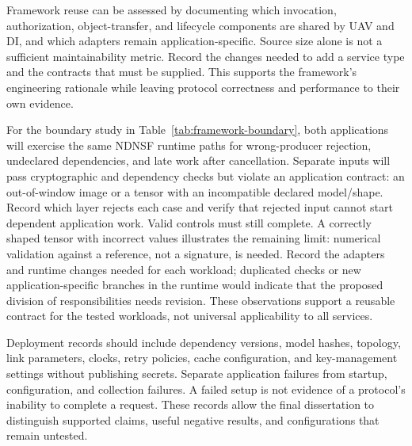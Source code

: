 Framework reuse can be assessed by documenting which invocation, authorization, object-transfer, and lifecycle components are shared by UAV and DI, and which adapters remain application-specific. Source size alone is not a sufficient maintainability metric. Record the changes needed to add a service type and the contracts that must be supplied. This supports the framework's engineering rationale while leaving protocol correctness and performance to their own evidence.

For the boundary study in Table~\ref{tab:framework-boundary}, both applications will exercise the same NDNSF runtime paths for wrong-producer rejection, undeclared dependencies, and late work after cancellation. Separate inputs will pass cryptographic and dependency checks but violate an application contract: an out-of-window image or a tensor with an incompatible declared model/shape. Record which layer rejects each case and verify that rejected input cannot start dependent application work. Valid controls must still complete. A correctly shaped tensor with incorrect values illustrates the remaining limit: numerical validation against a reference, not a signature, is needed. Record the adapters and runtime changes needed for each workload; duplicated checks or new application-specific branches in the runtime would indicate that the proposed division of responsibilities needs revision. These observations support a reusable contract for the tested workloads, not universal applicability to all services.

Deployment records should include dependency versions, model hashes, topology, link parameters, clocks, retry policies, cache configuration, and key-management settings without publishing secrets. Separate application failures from startup, configuration, and collection failures. A failed setup is not evidence of a protocol's inability to complete a request. These records allow the final dissertation to distinguish supported claims, useful negative results, and configurations that remain untested.
